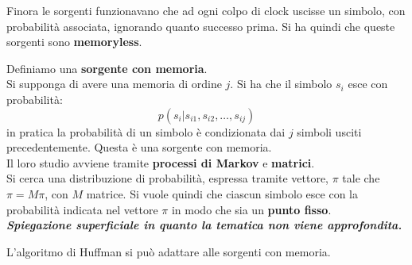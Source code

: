 \documentclass[a4paper,12pt, oneside]{book}
\begin{document}
Finora le sorgenti funzionavano che ad ogni colpo di clock uscisse un simbolo,
con probabilità associata, ignorando quanto successo prima. Si ha quindi che
queste sorgenti sono \textbf{memoryless}. 
\begin{definizione}
  Definiamo una \textbf{sorgente con memoria}.\\
  Si supponga di avere una memoria di ordine $j$. Si ha che il simbolo $s_i$
  esce con probabilità:
  \[p(s_i|s_{i1},s_{i2},\ldots,s_{ij})\]
  in pratica la probabilità di un simbolo è condizionata dai $j$ simboli usciti
  precedentemente. Questa è una sorgente con memoria.\\
  Il loro studio avviene tramite \textbf{processi di Markov} e
  \textbf{matrici}.\\
  Si cerca una distribuzione di probabilità, espressa tramite vettore, $\pi$
  tale che $\pi=M\pi$, con $M$ matrice. Si vuole quindi che ciascun simbolo esce
  con la probabilità indicata nel vettore $\pi$ in modo che sia un \textbf{punto
    fisso}. \\
  \textbf{\textit{Spiegazione superficiale in quanto la tematica non viene
      approfondita.}} 
\end{definizione}
L'algoritmo di Huffman si può adattare alle sorgenti con memoria.
\end{document}
